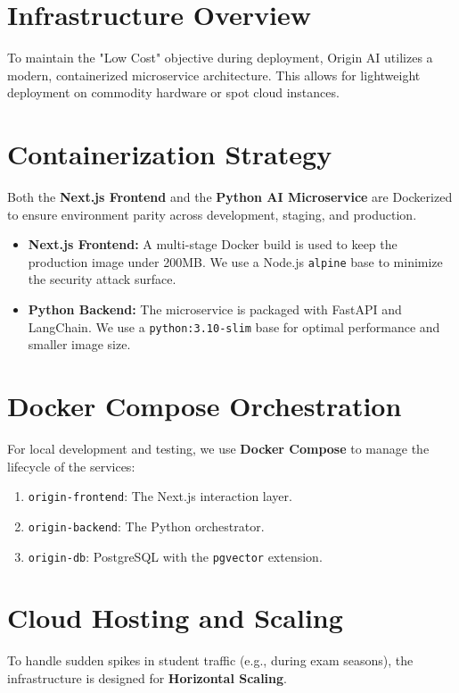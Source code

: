 \section{Infrastructure Overview}

To maintain the "Low Cost" objective during deployment, Origin AI utilizes a modern, containerized microservice architecture. This allows for lightweight deployment on commodity hardware or spot cloud instances.

\section{Containerization Strategy}

Both the \textbf{Next.js Frontend} and the \textbf{Python AI Microservice} are Dockerized to ensure environment parity across development, staging, and production.

\begin{itemize}
    \item \textbf{Next.js Frontend:} A multi-stage Docker build is used to keep the production image under 200MB. We use a Node.js \texttt{alpine} base to minimize the security attack surface.
    \item \textbf{Python Backend:} The microservice is packaged with FastAPI and LangChain. We use a \texttt{python:3.10-slim} base for optimal performance and smaller image size.
\end{itemize}

\section{Docker Compose Orchestration}

For local development and testing, we use \textbf{Docker Compose} to manage the lifecycle of the services:
\begin{enumerate}
    \item \texttt{origin-frontend}: The Next.js interaction layer.
    \item \texttt{origin-backend}: The Python orchestrator.
    \item \texttt{origin-db}: PostgreSQL with the \texttt{pgvector} extension.
\end{enumerate}

\section{Cloud Hosting and Scaling}

To handle sudden spikes in student traffic (e.g., during exam seasons), the infrastructure is designed for \textbf{Horizontal Scaling}.

